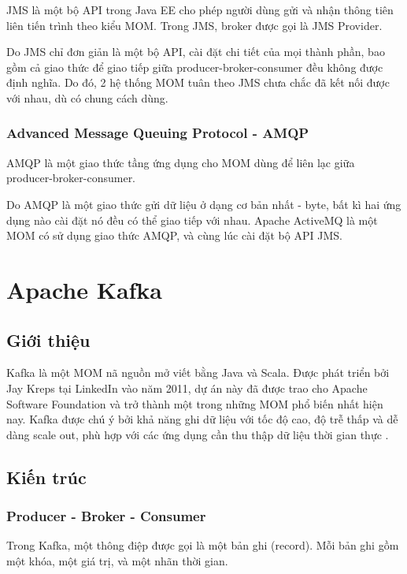 \documentclass{article}
\begin{document}
JMS là một bộ API trong Java EE cho phép người dùng gửi và nhận thông tiên liên
tiến trình theo kiểu MOM. Trong JMS, broker được gọi là JMS Provider.

Do JMS chỉ đơn giản là một bộ API, cài đặt chi tiết của mọi thành phần, bao gồm
cả giao thức để giao tiếp giữa producer-broker-consumer đều không được định
nghĩa. Do đó, 2 hệ thống MOM tuân theo JMS chưa chắc đã kết nối được với nhau,
dù có chung cách dùng.

\subsubsection{Advanced Message Queuing Protocol - AMQP}

AMQP là một giao thức tầng ứng dụng cho MOM dùng để liên lạc giữa
producer-broker-consumer.

Do AMQP là một giao thức gửi dữ liệu ở dạng cơ bản nhất - byte, bất kì hai ứng
dụng nào cài đặt nó đều có thể giao tiếp với nhau. Apache ActiveMQ là một MOM có
sử dụng giao thức AMQP, và cùng lúc cài đặt bộ API JMS.

\section{Apache Kafka} \label{kafka}

\subsection{Giới thiệu}

Kafka là một MOM nã nguồn mở viết bằng Java và Scala. Được phát triển bởi Jay
Kreps tại LinkedIn vào năm 2011, dự án này đã được trao cho Apache Software
Foundation và trở thành một trong những MOM phổ biến nhất hiện nay. Kafka được
chú ý bởi khả năng ghi dữ liệu với tốc độ cao, độ trễ thấp và dễ dàng scale out,
phù hợp với các ứng dụng cần thu thập dữ liệu thời gian thực \cite{kafka_intro}.

\subsection{Kiến trúc}

\subsubsection{Producer - Broker - Consumer}

Trong Kafka, một thông điệp được gọi là một bản ghi (record). Mỗi bản ghi gồm
một khóa, một giá trị, và một nhãn thời gian.
\end{document}

